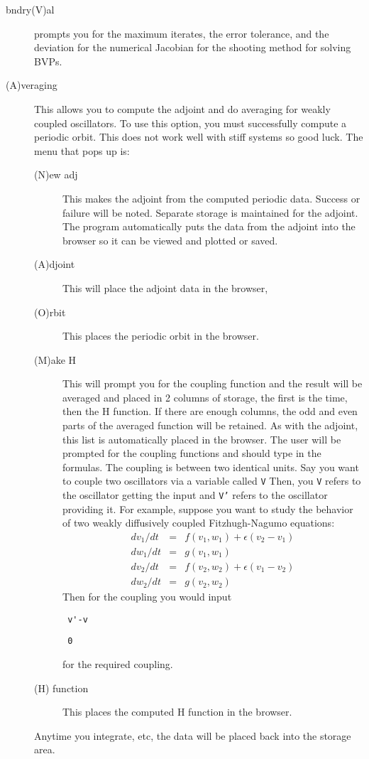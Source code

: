 \documentclass{article}
\newcommand{\beqa}{\begin{eqnarray}}
\newcommand{\eeqa}{\end{eqnarray}}
\newcommand{\bvb}{\begin{verbatim}}
\newcommand{\tc}[1]{\addcontentsline{toc}{subsection}{#1}}
\begin{document}
\begin{description}
\item[bndry(V)al] prompts you for the maximum iterates, the error tolerance, and the
 deviation for the numerical Jacobian for the shooting method for solving BVPs.
\tc{Averaging}\item[(A)veraging]  This allows you to compute the adjoint and do averaging for weakly
 coupled oscillators.  To use this option, you must successfully compute
 a periodic orbit.
 This does not
work well with stiff systems so good luck. The menu that pops up is:
\begin{description}
	\item[(N)ew adj]  This makes the adjoint from the computed periodic
 data.  Success or failure will be noted. Separate storage is
maintained for the adjoint.  The program automatically puts the data
from the adjoint into  the browser so it can be viewed and plotted or
saved.
\item[(A)djoint]  This will place the adjoint data in the browser,
\item[(O)rbit]  This places the periodic orbit in the browser.
\item[(M)ake H] This will prompt you for the coupling function and the result
 will be averaged and placed in 2 columns of storage, the first is the time,
then the H function. If there are enough columns, the odd and even
parts of the averaged function will be retained. As with the adjoint,
this list is automatically placed in the browser.
The user will be prompted for the coupling functions and
should type in the formulas. The coupling is between two identical
units.  Say you want to couple two oscillators via a variable called
{\tt V} Then, you {\tt V} refers to the oscillator getting the input
and {\tt V'} refers to the oscillator providing it.
  For example, suppose you want to study
the behavior of two weakly diffusively coupled Fitzhugh-Nagumo
equations:
\beqa
	dv_1/dt &=& f(v_1,w_1)+\epsilon (v_2-v_1) \\
	dw_1/dt &=& g(v_1,w_1) \\
	dv_2/dt &=& f(v_2,w_2)+\epsilon (v_1-v_2) \\
	dw_2/dt &=& g(v_2,w_2)
\eeqa
Then for the coupling you would input
\bvb
 v'-v
\end{verbatim}
\bvb
 0
\end{verbatim}
for the required coupling.

\item[(H) function]  This places the computed H function in the browser.
\end{description}
Anytime you integrate, etc, the data will be placed back into the storage area.
\end{description}
\end{document}
